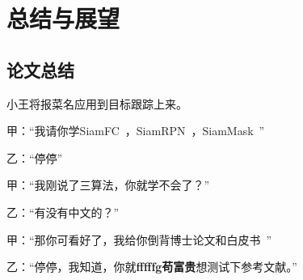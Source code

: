 \chapter{总结与展望}

\section{论文总结}
小王将报菜名应用到目标跟踪上来。

甲：“我请你学SiamFC~\cite{SiamFC}，SiamRPN~\cite{SiamRPN}，SiamMask~\cite{SiamMask}”

乙：“停停”

甲：“我刚说了三算法，你就学不会了？”

乙：“有没有中文的？”

甲：“那你可看好了，我给你倒背博士论文\cite{卢莉萍}和白皮书~\cite{白皮书2018}”

乙：“停停，我知道，你就\textbf{fffffg苟富贵}想测试下参考文献。”

